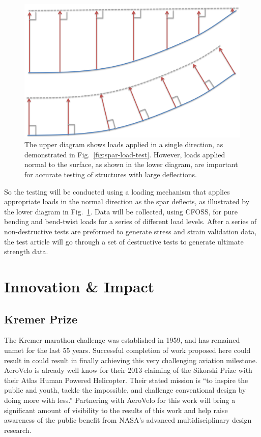 \documentclass[]{aiaa-tc}
\begin{document}
        \begin{figure}[!htbp]
            \centering
            \includegraphics[width=.75\textwidth]{images/follower_force}
            \caption{The upper diagram shows loads applied in a single direction, as demonstrated in Fig.~\ref{fig:spar-load-test}. However, loads applied normal to the surface, as shown in the lower diagram, are important for accurate testing of structures with large deflections.}
            \label{fig:follower-force}
        \end{figure}

        So the testing will be conducted using a loading mechanism that applies appropriate loads in the normal direction
        as the spar deflects, as illustrated by the lower diagram in Fig.~\ref{fig:follower-force}. Data will be collected, using CFOSS, for pure bending and bend-twist loads for a series of different 
        load levels. After a series of non-destructive tests are preformed to generate stress and strain validation data, the test 
        article will go through a set of destructive tests to generate ultimate strength data. 


  \section{Innovation \& Impact}

    \subsection{Kremer Prize}
    The Kremer marathon challenge was established in 1959, and has remained unmet for the last 55 years. 
    Successful completion of work proposed here could result in could result in finally achieving this very challenging
    aviation milestone. AeroVelo is already well know for their 2013 claiming of the Sikorski Prize with their Atlas 
    Human Powered Helicopter. Their stated mission is ``to inspire the public and youth, tackle the impossible, and 
    challenge conventional design by doing more with less.'' Partnering with AeroVelo for this work will bring a significant
    amount of visibility to the results of this work and help raise awareness of the public benefit from NASA's advanced 
    multidisciplinary design research. 
\end{document}
